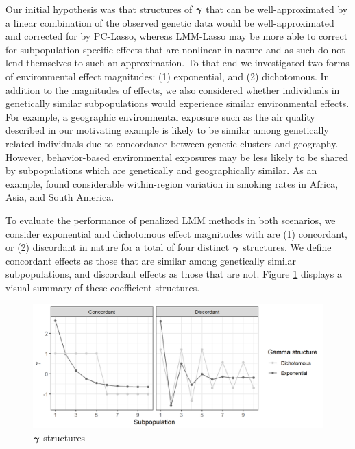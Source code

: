  Our initial hypothesis was that structures of $\boldsymbol{\gamma}$ that can be well-approximated by a linear combination of the observed genetic data would be well-approximated and corrected for by PC-Lasso, whereas LMM-Lasso may be more able to correct for subpopulation-specific effects that are nonlinear in nature and as such do not lend themselves to such an approximation. To that end we investigated two forms of environmental effect magnitudes: (1) exponential, and (2) dichotomous.  In addition to the magnitudes of effects, we also considered whether individuals in genetically similar subpopulations would experience similar environmental effects. For example, a geographic environmental exposure such as the air quality described in our motivating example is likely to be similar among genetically related individuals due to concordance between genetic clusters and geography. However, behavior-based environmental exposures may be less likely to be shared by subpopulations which are genetically and geographically similar.  As an example, \citep{ng2014smoking} found considerable within-region variation in smoking rates in Africa, Asia, and South America.

 To evaluate the performance of penalized LMM methods in both scenarios, we consider exponential and dichotomous effect magnitudes with are (1) concordant, or (2) discordant in nature for a total of four distinct $\boldsymbol{\gamma}$ structures. We define concordant effects as those that are similar among genetically similar subpopulations, and discordant effects as those that are not. Figure \ref{fig:gamma_structures} displays a visual summary of these coefficient structures. 
\begin{figure}[H]
    \centering
    \includegraphics[scale = 0.9]{figures/gamma_structure.png}
    \caption{$\boldsymbol{\gamma}$ structures}
    \label{fig:gamma_structures}
\end{figure}



